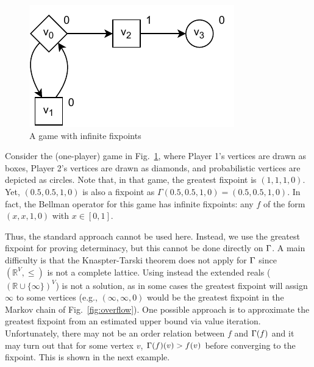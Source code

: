\begin{figure}
\centering
\includegraphics[scale=0.6]{Figs/inf-fixpoints-horiz.pdf}\hspace{-2ex}
\caption{A game with infinite fixpoints} \label{fig:multiple-fixpoints}
\end{figure}
\begin{example}\label{ex:several-fixpoints} Consider the (one-player) game in Fig.~\ref{fig:multiple-fixpoints}, where Player 1's vertices are drawn as boxes, Player 2's vertices are drawn as diamonds, and probabilistic vertices are depicted as circles. Note that, in that game, the greatest fixpoint is $(1,1,1,0)$.  Yet, $(0.5,0.5,1,0)$ is also a fixpoint as $\Gamma(0.5,0.5,1,0) = (0.5,0.5,1,0)$.  In fact, the Bellman operator for this game has infinite fixpoints: any $f$ of the form $(x,x,1,0)$ with $x\in[0,1]$.
\end{example}

Thus, the standard approach cannot be used here. Instead, we use the greatest fixpoint for proving determinacy, but this cannot be done directly on $\Gamma$.  A main difficulty is that the Knaspter-Tarski theorem does not apply for $\Gamma$ since $(\mathbb{R}^V, \leq)$ is not a complete lattice.  Using instead the extended reals ($(\mathbb{R} \cup \{\infty\})^V$) is not a solution, as in some cases the greatest fixpoint will assign $\infty$ to some vertices (e.g., $(\infty,\infty,0)$ would be the greatest fixpoint in the Markov chain of Fig.~\ref{fig:overflow}).
One possible approach is to approximate the greatest fixpoint from an estimated upper bound via value iteration.  Unfortunately, there may not be an order relation between $f$ and $\Gamma(f)$ and it may turn out that for some vertex $v$, $\Gamma(f)(v)>f(v)$  before converging to the fixpoint. This is shown in the next example.

